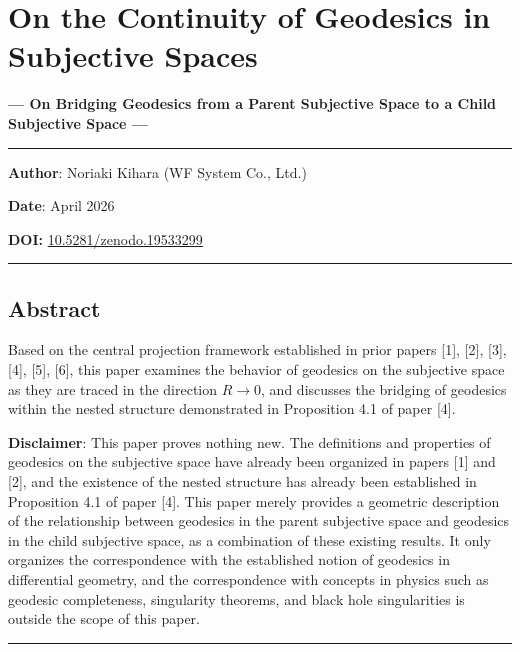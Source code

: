 \documentclass[a4paper,11pt]{article}
\theoremstyle{definition}
\begin{document}
\section{On the Continuity of Geodesics in Subjective Spaces}\label{on-the-continuity-of-geodesics-in-subjective-spaces}

\textbf{--- On Bridging Geodesics from a Parent Subjective Space to a Child Subjective Space ---}

\begin{center}\rule{0.5\linewidth}{0.5pt}\end{center}

\textbf{Author}: Noriaki Kihara (WF System Co., Ltd.)

\textbf{Date}: April 2026

\textbf{DOI:} \href{https://doi.org/10.5281/zenodo.19533299}{10.5281/zenodo.19533299}

\begin{center}\rule{0.5\linewidth}{0.5pt}\end{center}

\subsection{Abstract}\label{abstract}

Based on the central projection framework established in prior papers {[}1{]}, {[}2{]}, {[}3{]}, {[}4{]}, {[}5{]}, {[}6{]}, this paper examines the behavior of geodesics on the subjective space as they are traced in the direction \(R \to 0\), and discusses the bridging of geodesics within the nested structure demonstrated in Proposition 4.1 of paper {[}4{]}.

\textbf{Disclaimer}: This paper proves nothing new. The definitions and properties of geodesics on the subjective space have already been organized in papers {[}1{]} and {[}2{]}, and the existence of the nested structure has already been established in Proposition 4.1 of paper {[}4{]}. This paper merely provides a geometric description of the relationship between geodesics in the parent subjective space and geodesics in the child subjective space, as a combination of these existing results. It only organizes the correspondence with the established notion of geodesics in differential geometry, and the correspondence with concepts in physics such as geodesic completeness, singularity theorems, and black hole singularities is outside the scope of this paper.

\begin{center}\rule{0.5\linewidth}{0.5pt}\end{center}
\end{document}
